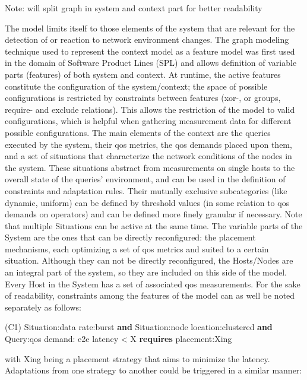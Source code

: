 Note: will split graph in system and context part for better readability 


The model limits itself to those elements of the system that are relevant for the detection of or reaction to network environment changes.
The graph modeling technique used to represent the context model as a feature model was first used in the domain of Software Product Lines (SPL) and allows definition of variable parts (features) of both system and context. At runtime, the active features constitute the configuration of the system/context; the space of possible configurations is restricted by constraints between features (xor-, or groups, require- and exclude relations). This allows the restriction of the model to valid configurations, which is helpful when gathering measurement data for different possible configurations. 
The main elements of the context are the queries executed by the system, their \gls{qos} metrics, the \gls{qos} demands placed upon them, and a set of situations that characterize the network conditions of the nodes in the system. These situations abstract from measurements on single hosts to the overall state of the queries' environment, and can be used in the definition of constraints and adaptation rules. Their mutually exclusive subcategories (like dynamic, uniform) can be defined by threshold values (in some relation to \gls{qos} demands on operators) and can be defined more finely granular if necessary. Note that multiple Situations can be active at the same time.
The variable parts of the System are the ones that can be directly reconfigured: the placement mechanisms, each optimizing a set of \gls{qos} metrics and suited to a certain situation. Although they can not be directly reconfigured, the Hosts/Nodes are an integral part of the system, so they are included on this side of the model. Every Host in the System has a set of associated \gls{qos} measurements.
For the sake of readability, constraints among the features of the model can as well be noted separately as follows: 
\newline
\begin{center}
 (C1) Situation:data rate:burst \textbf{and} Situation:node location:clustered \textbf{and} Query:\gls{qos} demand: e2e latency < X \textbf{requires} placement:Xing\\
 
 \end{center} 
with Xing being a placement strategy that aims to minimize the latency.
Adaptations from one strategy to another could be triggered in a similar manner:

